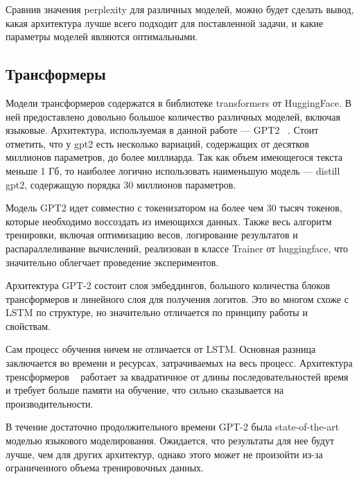 Сравнив значения perplexity для различных моделей, можно будет сделать вывод, какая архитектура лучше всего подходит для поставленной задачи, и какие параметры моделей являются оптимальными.

\subsection{Трансформеры}

Модели трансформеров содержатся в библиотеке transformers от HuggingFace. В ней предоставлено довольно большое количество различных моделей, включая языковые. Архитектура, используемая в данной работе --- GPT2 ~\cite{gpt2}. Стоит отметить, что у gpt2 есть несколько вариаций, содержащих от десятков миллионов параметров, до более миллиарда. Так как объем имеющегося текста меньше 1 Гб, то наиболее логично использовать наименьшую модель --- distill gpt2, содержащую порядка 30 миллионов параметров.

Модель GPT2 идет совместно с токенизатором на более чем 30 тысяч токенов, которые необходимо воссоздать из имеющихся данных. Также весь алгоритм тренировки, включая оптимизацию весов, логирование результатов и распараллеливание вычислений, реализован в классе Trainer от huggingface, что значительно облегчает проведение экспериментов.

Архитектура GPT-2 состоит слоя эмбеддингов, большого количества блоков трансформеров и линейного слоя для получения логитов. Это во многом схоже с LSTM по структуре, но значительно отличается по принципу работы и свойствам.

Сам процесс обучения ничем не отличается от LSTM. Основная разница заключается во времени и ресурсах, затрачиваемых на весь процесс. Архитектура тренсформеров ~\cite{attention-is-all-you-need} работает за квадратичное от длины последовательностей время и требует больше памяти на обучение, что сильно сказывается на производительности.

В течение достаточно продолжительного времени GPT-2 была state-of-the-art моделью языкового моделирования. Ожидается, что результаты для нее будут лучше, чем для других архитектур, однако этого может не произойти из-за ограниченного объема тренировочных данных.

